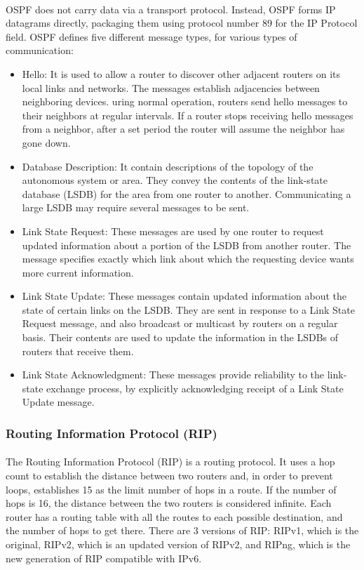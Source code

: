 \documentclass[12pt,a4paper]{report}
\begin{document}
\paragraph{}OSPF does not carry data via a transport protocol. Instead, OSPF forms IP datagrams directly, packaging them using protocol number 89 for the IP Protocol field. OSPF defines five different message types, for various types of communication:
\begin{itemize}
\item Hello: It is used to allow a router to discover other adjacent routers on its local links and networks. The messages establish adjacencies between neighboring devices. uring normal operation, routers send hello messages to their neighbors at regular intervals. If a router stops receiving hello messages from a neighbor, after a set period the router will assume the neighbor has gone down.
\item Database Description: It contain descriptions of the topology of the autonomous system or area.  They convey the contents of the link-state database (LSDB) for the area from one router to another. Communicating a large LSDB may require several messages to be sent.
\item Link State Request: These messages are used by one router to request updated information about a portion of the LSDB from another router. The message specifies exactly which link about which the requesting device wants more current information.
\item Link State Update: These messages contain updated information about the state of certain links on the LSDB. They are sent in response to a Link State Request message, and also broadcast or multicast by routers on a regular basis. Their contents are used to update the information in the LSDBs of routers that receive them.
\item Link State Acknowledgment: These messages provide reliability to the link-state exchange process, by explicitly acknowledging receipt of a Link State Update message.
\end{itemize}

\subsubsection{Routing Information Protocol (RIP)\cite{RIPv2}\cite{RIPng}}
\paragraph{}The Routing Information Protocol (RIP) is a routing protocol. It uses a hop count to establish the distance between two routers and, in order to prevent loops, establishes 15 as the limit number of hops in a route. If the number of hops is 16, the distance between the two routers is considered infinite. Each router has a routing table with all the routes to each possible destination, and the number of hops to get there. There are 3 versions of RIP: RIPv1, which is the original, RIPv2, which is an updated version of RIPv2, and RIPng, which is the new generation of RIP compatible with IPv6.
\end{document}
